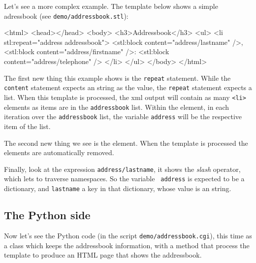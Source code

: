 Let's see a more complex example. The template below shows a simple
adressbook (see {\tt demo/addressbook.stl}):

\begin{code}
    <html>
      <head></head>
      <body>
        <h3>Addressbook</h3>
        <ul>
          <li stl:repeat="address addressbook">
            <stl:block content="address/lastname" />,
            <stl:block content="address/firstname" />:
            <stl:block content="address/telephone" />
          </li>
        </ul>
      </body>
    </html>
\end{code}

The first new thing this example shows is the {\tt repeat} statement. While
the {\tt content} statement expects an string as the value, the {\tt repeat}
statement expects a list. When this template is processed, the xml output
will contain as many {\tt <li>} elements as items are in the {\tt addressbook}
list. Within the element, in each iteration over the {\tt addressbook} list,
the variable {\tt address} will be the respective item of the list.

The second new thing we see is the {\tt <stl:block>} element. When the
template is processed the {\tt <stl:block>} elements are automatically
removed.

Finally, look at the expression {\tt address/lastname}, it shows the {\em
slash} operator, which lets to traverse namespaces. So the variable {\tt
address} is expected to be a dictionary, and {\tt lastname} a key in that
dictionary, whose value is an string.

\subsection{The Python side}

Now let's see the Python code (in the script {\tt demo/addressbook.cgi}),
this time as a class which keeps the addressbook information, with a method
that process the template to produce an HTML page that shows the addressbook.

